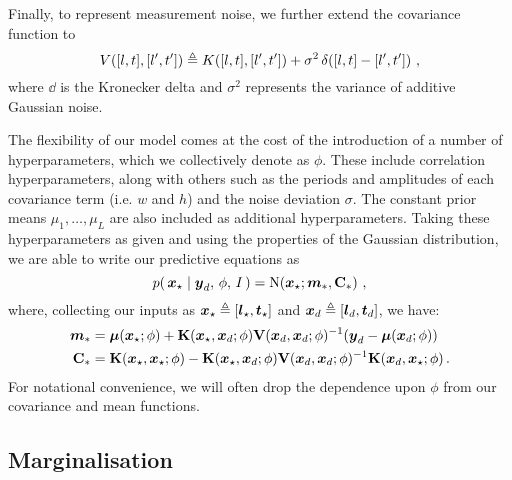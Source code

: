 \documentclass{acmtrans2m}
\begin{document}
 Finally, to represent measurement noise, we further extend the covariance function to
\small\begin{equation*}
V([l,t],[l',t'])\triangleq K([l,t],[l',t'])+ \sigma^2\,\delta\!\left([l,t]-[l',t']\right)\,,
\end{equation*}
where $\dd{}{}$ is the Kronecker delta and $\sigma^2$ represents the variance of additive Gaussian noise.

The flexibility of our model comes at the cost of the introduction of a number of hyperparameters, which we collectively denote as $\phi$. These include correlation hyperparameters, along with others such as the periods and amplitudes of each covariance term (i.e. $w$ and $h$) and the noise deviation $\sigma$. The constant prior means $\mu_1,\ldots,\mu_L$ are also included as additional hyperparameters. Taking these hyperparameters as given and using the properties of the Gaussian distribution, we are able to write our predictive equations as
\begin{equation} \label{eq:GPMeanVar}
p\!\left(\,\boldsymbol{x}_\star\mid\boldsymbol{y}_d,\,\phi,\,I\,\right)=\text{N}\!\left(\boldsymbol{x}_\star;\boldsymbol{m}_\ast,\mathbf{C}_\ast\right)\,,
\end{equation}
where, collecting our inputs as $\boldsymbol{x}_\star\triangleq[\boldsymbol{l}_\star,\boldsymbol{t}_\star]$ and $\boldsymbol{x}_d\triangleq[\boldsymbol{l}_d,\boldsymbol{t}_d]$, we have:
\begin{align} 
\boldsymbol{m}_\ast&=\boldsymbol{\mu}(\boldsymbol{x}_\star;\phi)+\mathbf{K}(\boldsymbol{x}_\star,\boldsymbol{x}_d;\phi)\mathbf{V}(\boldsymbol{x}_d,\boldsymbol{x}_d;\phi)^{-1}(\boldsymbol{y}_d-\boldsymbol{\mu}(\boldsymbol{x}_d;\phi))\label{eq:GPMean}\\
\mathbf{C}_\ast&=\mathbf{K}(\boldsymbol{x}_\star,\boldsymbol{x}_\star;\phi)-\mathbf{K}(\boldsymbol{x}_\star,\boldsymbol{x}_d;\phi)\mathbf{V}(\boldsymbol{x}_d,\boldsymbol{x}_d;\phi)^{-1}\mathbf{K}(\boldsymbol{x}_d,\boldsymbol{x}_\star;\phi)\label{eq:GPVar}\,.
\end{align}
For notational convenience, we will often drop the dependence upon $\phi$ from our covariance and mean functions.

\subsection{Marginalisation}
\end{document}
